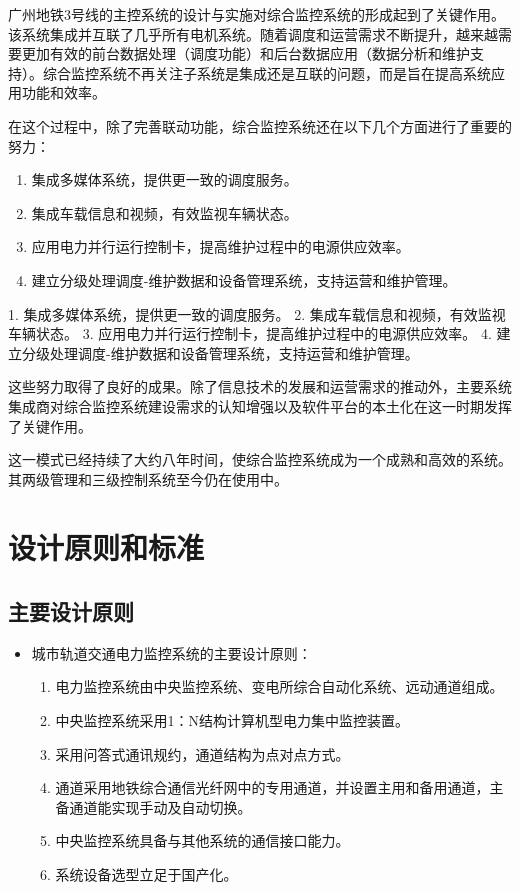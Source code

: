 广州地铁3号线的主控系统的设计与实施对综合监控系统的形成起到了关键作用。该系统集成并互联了几乎所有电机系统。随着调度和运营需求不断提升，越来越需要更加有效的前台数据处理（调度功能）和后台数据应用（数据分析和维护支持）。综合监控系统不再关注子系统是集成还是互联的问题，而是旨在提高系统应用功能和效率。

在这个过程中，除了完善联动功能，综合监控系统还在以下几个方面进行了重要的努力：
\begin{enumerate}
	\item 集成多媒体系统，提供更一致的调度服务。
	\item 集成车载信息和视频，有效监视车辆状态。
	\item 应用电力并行运行控制卡，提高维护过程中的电源供应效率。
	\item 建立分级处理调度-维护数据和设备管理系统，支持运营和维护管理。
\end{enumerate}
1. 集成多媒体系统，提供更一致的调度服务。
2. 集成车载信息和视频，有效监视车辆状态。
3. 应用电力并行运行控制卡，提高维护过程中的电源供应效率。
4. 建立分级处理调度-维护数据和设备管理系统，支持运营和维护管理。

这些努力取得了良好的成果。除了信息技术的发展和运营需求的推动外，主要系统集成商对综合监控系统建设需求的认知增强以及软件平台的本土化在这一时期发挥了关键作用。

这一模式已经持续了大约八年时间，使综合监控系统成为一个成熟和高效的系统。其两级管理和三级控制系统至今仍在使用中。

\section{设计原则和标准}
\subsection{主要设计原则}
\begin{itemize}
	\item 城市轨道交通电力监控系统的主要设计原则：
	\begin{enumerate}
		\item 电力监控系统由中央监控系统、变电所综合自动化系统、远动通道组成。
		\item 中央监控系统采用1：N结构计算机型电力集中监控装置。
		\item 采用问答式通讯规约，通道结构为点对点方式。
		\item 通道采用地铁综合通信光纤网中的专用通道，并设置主用和备用通道，主备通道能实现手动及自动切换。
		\item 中央监控系统具备与其他系统的通信接口能力。
		\item 系统设备选型立足于国产化。
	\end{enumerate}
\end{itemize}
